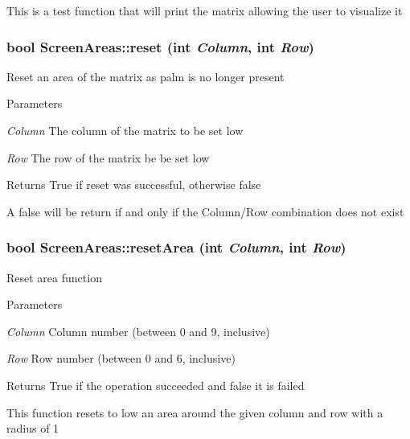 This is a test function that will print the matrix allowing the user to visualize it \hypertarget{classScreenAreas_aaad2df8786b44cdc919339e276e432fc}{
\subsubsection[{reset}]{\setlength{\rightskip}{0pt plus 5cm}bool ScreenAreas::reset (int {\em Column}, \/  int {\em Row})}}
\label{classScreenAreas_aaad2df8786b44cdc919339e276e432fc}
Reset an area of the matrix as palm is no longer present 
\begin{DoxyParams}{Parameters}
\item[{\em Column}]The column of the matrix to be set low \item[{\em Row}]The row of the matrix be be set low\end{DoxyParams}
\begin{DoxyReturn}{Returns}
True if reset was successful, otherwise false
\end{DoxyReturn}
A false will be return if and only if the Column/Row combination does not exist \hypertarget{classScreenAreas_a2e3ae5d88fd9e06bd2f14000af32d387}{
\subsubsection[{resetArea}]{\setlength{\rightskip}{0pt plus 5cm}bool ScreenAreas::resetArea (int {\em Column}, \/  int {\em Row})}}
\label{classScreenAreas_a2e3ae5d88fd9e06bd2f14000af32d387}
Reset area function


\begin{DoxyParams}{Parameters}
\item[{\em Column}]Column number (between 0 and 9, inclusive) \item[{\em Row}]Row number (between 0 and 6, inclusive)\end{DoxyParams}
\begin{DoxyReturn}{Returns}
True if the operation succeeded and false it is failed
\end{DoxyReturn}
This function resets to low an area around the given column and row with a radius of 1

